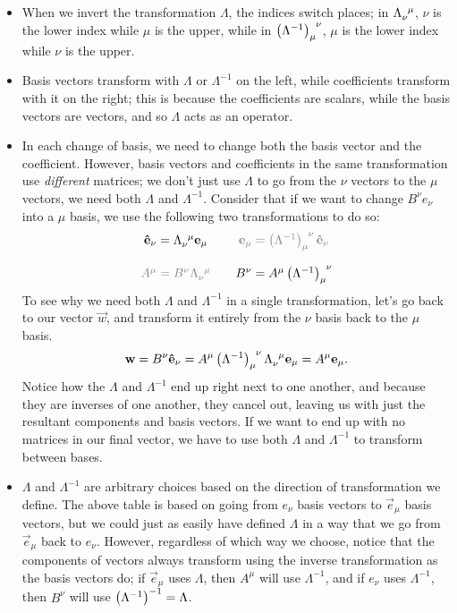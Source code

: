 \begin{itemize}
    \item When we invert the transformation $\Lambda$, the indices switch places; in $\tensor{\Lambda}{_\nu^\mu}$, $\nu$ is the lower index while $\mu$ is the upper, while in $\tensor{\left(\Lambda^{-1}\right)}{_\mu^\nu}$, $\mu$ is the lower index while $\nu$ is the upper.
    \item Basis vectors transform with $\Lambda$ or $\Lambda^{-1}$ on the left, while coefficients transform with it on the right; this is because the coefficients are scalars, while the basis vectors are vectors, and so $\Lambda$ acts as an operator.
    \item In each change of basis, we need to change both the basis vector and the coefficient. However, basis vectors and coefficients in the same transformation use \emph{different} matrices; we don't just use $\Lambda$ to go from the $\nu$ vectors to the $\mu$ vectors, we need both $\Lambda$ and $\Lambda^{-1}$.
    Consider that if we want to change $B^\nu \unit{e}_\nu$ into a $\mu$ basis, we use the following two transformations to do so:
    \[
        \begin{matrix}
            \unit{e}_\nu = \tensor{\Lambda}{_\nu^\mu} \vec{e}_\mu &  & \mathcolor{gray}{\vec{e}_\mu = \tensor{\left(\Lambda^{-1}\right)}{_\mu^\nu}\unit{e}_\nu} \\
            & & \\
             \mathcolor{gray}{A^\mu = B^\nu\tensor{\Lambda}{_\nu^\mu}} & & B^\nu = A^\mu \tensor{\left(\Lambda^{-1}\right)}{_\mu^\nu}
        \end{matrix}
    \]
    To see why we need both $\Lambda$ and $\Lambda^{-1}$ in a single transformation, let's go back to our vector $\vec{w}$, and transform it entirely from the $\nu$ basis back to the $\mu$ basis.
    \[
        \vec{w} = B^\nu \unit{e}_\nu = A^\mu \tensor{\left(\Lambda^{-1}\right)}{_\mu^\nu} \tensor{\Lambda}{_\nu^\mu} \vec{e}_\mu = A^\mu \vec{e}_\mu.
    \]
    Notice how the $\Lambda$ and $\Lambda^{-1}$ end up right next to one another, and because they are inverses of one another, they cancel out, leaving us with just the resultant components and basis vectors.
    If we want to end up with no matrices in our final vector, we have to use both $\Lambda$ and $\Lambda^{-1}$ to transform between bases.
    \item $\Lambda$ and $\Lambda^{-1}$ are arbitrary choices based on the direction of transformation we define.
    The above table is based on going from $\unit{e}_\nu$ basis vectors to $\vec{e}_\mu$ basis vectors, but we could just as easily have defined $\Lambda$ in a way that we go from $\vec{e}_\mu$ back to $\unit{e}_\nu$.
    However, regardless of which way we choose, notice that the components of vectors always transform using the inverse transformation as the basis vectors do; if $\vec{e}_\mu$ uses $\Lambda$, then $A^\mu$ will use $\Lambda^{-1}$, and if $\unit{e}_\nu$ uses $\Lambda^{-1}$, then $B^\nu$ will use $\qty(\Lambda^{-1})^{-1} = \Lambda$.
\end{itemize}

